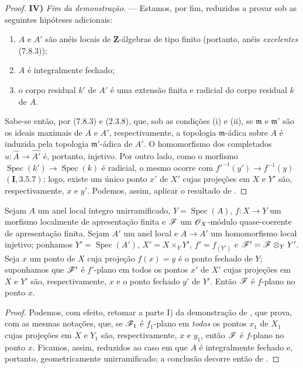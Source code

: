 \begin{proof}
\medskip
\noindent\textbf{IV)} \emph{Fim
da demonstração.} --- Estamos,
por fim, reduzidos a provar
 sob as
seguintes hipóteses adicionais:
\begin{enumerate}[label=(\roman*)]
  \item $A$ e $A'$ são anéis
  locais de $\mathbf Z$-álgebras
  de tipo finito (portanto,
  anéis \emph{excelentes}
  (7.8.3));
  \item $A$ é integralmente
  fechado;
  \item o corpo residual $k'$
  de $A'$ é uma extensão finita
  e radicial do corpo residual
  $k$ de $A$.
\end{enumerate}
Sabe-se então, por (7.8.3)
e (2.3.8), que, sob as condições
(i) e (ii), se $\mathfrak m$ e
$\mathfrak m'$ são os ideais
maximais de $A$ e $A'$,
respectivamente, a topologia
$\mathfrak m$-ádica sobre $A$
é induzida pela topologia
$\mathfrak m'$-ádica de $A'$.
O homomorfismo dos completados
$\widehat u:\widehat A
\to\widehat{A'}$ é, portanto,
injetivo. Por outro lado,
como o morfismo
$\operatorname{Spec}(k')
\to\operatorname{Spec}(k)$
é radicial, o mesmo ocorre
com $f'^{-1}(y')\to f^{-1}(y)$
$(\mathbf I,3.5.7)$; logo,
existe um único ponto $x'$
de $X'$ cujas projeções em
$X$ e $Y'$ são, respectivamente,
$x$ e $y'$. Podemos, assim,
aplicar o resultado de
.
\end{proof}

\begin{corollary}[11.6.2]
\label{IV.11.6.2}
Sejam $A$ um anel local
íntegro unirramificado,
$Y=\operatorname{Spec}(A)$,
$f:X\to Y$ um morfismo
localmente de apresentação
finita e $\mathscr{F}$ um
$\mathscr{O}_X$-módulo quase-coerente
de apresentação finita.
Sejam $A'$ um anel local e
$A\to A'$ um homomorfismo
local injetivo; ponhamos
$Y'=\operatorname{Spec}(A')$,
$X'=X\times_Y Y'$, $f'=f_{(Y')}$
e $\mathscr{F}'=\mathscr{F}\otimes_Y Y'$.
Seja $x$ um ponto de $X$ cuja
projeção $f(x)=y$ é o ponto
fechado de $Y$; suponhamos
que $\mathscr{F}'$ é $f'$-plano em
todos os pontos $x'$ de $X'$
cujas projeções em $X$ e $Y'$
são, respectivamente, $x$ e
o ponto fechado $y'$ de $Y'$.
Então $\mathscr{F}$ é $f$-plano
no ponto $x$.
\end{corollary}

\begin{proof}
Podemos, com efeito, retomar
a parte I) da demonstração de
, que prova,
com as mesmas notações, que,
se $\mathscr{F}_1$ é $f_1$-plano
em \emph{todos} os pontos
$x_1$ de $X_1$ cujas projeções
em $X$ e $Y_1$ são,
respectivamente, $x$ e $y_1$,
então $\mathscr{F}$ é $f$-plano
no ponto $x$. Ficamos, assim,
reduzidos ao caso em que $A$
é integralmente fechado e,
portanto, geometricamente
unirramificado; a conclusão
decorre então de
.
\end{proof}

